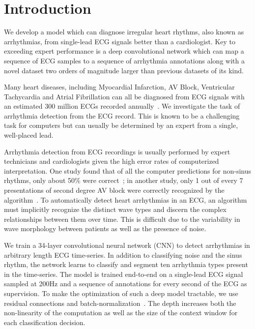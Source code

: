 \section{Introduction}
\label{sec:arrhythmias:intro}

We develop a model which can diagnose irregular heart rhythms, also known as
arrhythmias, from single-lead ECG signals better than a cardiologist. Key to
exceeding expert performance is a deep convolutional network which can map a
sequence of ECG samples to a sequence of arrhythmia annotations along with a
novel dataset two orders of magnitude larger than previous datasets of its
kind.

Many heart diseases, including Myocardial Infarction, AV Block, Ventricular
Tachycardia and Atrial Fibrillation can all be diagnosed from ECG signals with
an estimated 300 million ECGs recorded annually~\cite{heden1996detection}. We
investigate the task of arrhythmia detection from the ECG record. This is known
to be a challenging task for computers but can usually be determined by an
expert from a single, well-placed lead.

Arrhythmia detection from ECG recordings is usually performed by expert
technicians and cardiologists given the high error rates of computerized
interpretation.  One study found that of all the computer predictions for
non-sinus rhythms, only about 50\% were correct~\cite{shah2007errors}; in
another study, only 1 out of every 7 presentations of second degree AV block
were correctly recognized by the algorithm~\cite{guglin2006common}. To
automatically detect heart arrhythmias in an ECG, an algorithm must implicitly
recognize the distinct wave types and discern the complex relationships between
them over time. This is difficult due to the variability in wave morphology
between patients as well as the presence of noise.

We train a 34-layer convolutional neural network (CNN) to detect arrhythmias in
arbitrary length ECG time-series. In addition to classifying noise and the
sinus rhythm, the network learns to classify and segment ten arrhythmia types
present in the time-series. The model is trained end-to-end on a single-lead
ECG signal sampled at 200Hz and a sequence of annotations for every second of
the ECG as supervision. To make the optimization of such a deep model
tractable, we use residual connections and
batch-normalization~\cite{he2016deep, ioffe2015batch}.  The depth increases
both the non-linearity of the computation as well as the size of the context
window for each classification decision.

